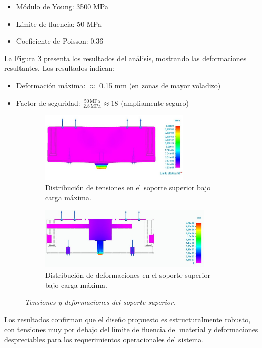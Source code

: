 \begin{itemize}[label=$\bullet$]
    \item Módulo de Young: 3500 MPa
    \item Límite de fluencia: 50 MPa
    \item Coeficiente de Poisson: 0.36
\end{itemize}

La Figura \ref{fig:SuperiorReal_simplificado_tensiones} presenta los resultados del análisis, mostrando las deformaciones resultantes. Los resultados indican:

\begin{itemize}[label=$\bullet$]
    \item Deformación máxima: $\approx$ 0.15 mm (en zonas de mayor voladizo)
    \item Factor de seguridad: $\frac{50\,\text{MPa}}{2.8\,\text{MPa}} \approx 18$ (ampliamente seguro)
\end{itemize}

\begin{figure}[H]
    \centering
    \begin{subfigure}{0.48\textwidth}
        \centering
    \includegraphics[width=0.78\textwidth]{img/tensiones_Real.jpg}
    \caption{Distribución de tensiones en el soporte superior bajo carga máxima.}
    \label{fig:tensiones_Real}
    \end{subfigure}
    \hspace{0.5cm}
    \begin{subfigure}{0.48\textwidth}
        \centering
    \includegraphics[width=0.9\textwidth]{img/SuperiorReal_simplificado_tensiones.jpg}
    \caption{Distribución de deformaciones en el soporte superior bajo carga máxima.}
    \label{fig:SuperiorReal_simplificado_tensiones}
    \end{subfigure}
    \caption{\textit{Tensiones y deformaciones del soporte superior.}}
\end{figure}
Los resultados confirman que el diseño propuesto es estructuralmente robusto, con tensiones muy por debajo del límite de fluencia del material y deformaciones despreciables para los requerimientos operacionales del sistema.

